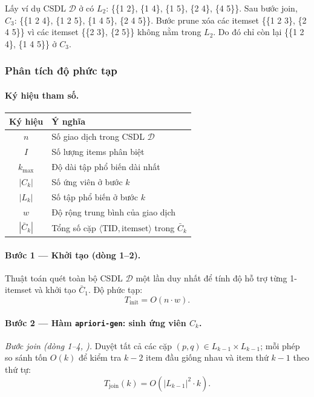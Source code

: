\documentclass[12pt]{article}
\begin{document}
Lấy ví dụ CSDL $\mathcal{D}$ ở  có $L_2$: \{\{1 2\}, \{1 4\}, \{1 5\}, \{2 4\}, \{4 5\}\}. Sau bước join, $C_3$: \{\{1 2 4\}, \{1 2 5\}, \{1 4 5\}, \{2 4 5\}\}. Bước prune xóa các itemset \{\{1 2 3\}, \{2 4 5\}\} vì các itemset \{\{2 3\}, \{2 5\}\} không nằm trong $L_2$. Do đó chỉ còn lại \{\{1 2 4\}, \{1 4 5\}\} ở $C_3$.

\subsubsection{Phân tích độ phức tạp}

\paragraph{Ký hiệu tham số.}
\begin{table}[h!]
\centering
\begin{tabular}{cl}
\hline
\textbf{Ký hiệu} & \textbf{Ý nghĩa} \\
\hline
$n$           & Số giao dịch trong CSDL $\mathcal{D}$ \\
$I$           & Số lượng items phân biệt \\
$k_{\max}$    & Độ dài tập phổ biến dài nhất \\
$|C_k|$       & Số ứng viên ở bước $k$ \\
$|L_k|$       & Số tập phổ biến ở bước $k$ \\
$w$           & Độ rộng trung bình của giao dịch \\
$|\bar{C}_k|$ & Tổng số cặp $\langle\text{TID}, \text{itemset}\rangle$ trong $\bar{C}_k$ \\
\hline
\end{tabular}
\end{table}

\paragraph{Bước 1 — Khởi tạo (dòng 1--2).}
Thuật toán quét toàn bộ CSDL $\mathcal{D}$ một lần duy nhất để tính độ hỗ trợ
từng 1-itemset và khởi tạo $\bar{C}_1$.
Độ phức tạp:
\[
  T_{\text{init}} = O(n \cdot w).
\]

\paragraph{Bước 2 — Hàm \texttt{apriori-gen}: sinh ứng viên $C_k$.}

\textit{Bước join (dòng 1--4, ).}
Duyệt tất cả các cặp $(p,q) \in L_{k-1} \times L_{k-1}$; mỗi phép so sánh
tốn $O(k)$ để kiểm tra $k-2$ item đầu giống nhau và item thứ $k-1$ theo thứ tự:
\[
  T_{\text{join}}(k) = O\!\left(|L_{k-1}|^2 \cdot k\right).
\]
\end{document}
